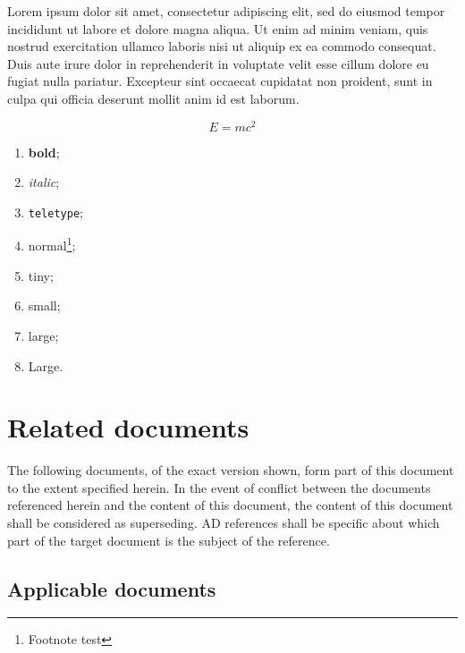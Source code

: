\documentclass[12pt,a4paper]{article}
\begin{document}
Lorem ipsum dolor sit amet, consectetur adipiscing elit, sed do eiusmod tempor incididunt ut labore et dolore magna aliqua. Ut enim ad minim veniam, quis nostrud exercitation ullamco laboris nisi ut aliquip ex ea commodo consequat. Duis aute irure dolor in reprehenderit in voluptate velit esse cillum dolore eu fugiat nulla pariatur. Excepteur sint occaecat cupidatat non proident, sunt in culpa qui officia deserunt mollit anim id est laborum.


\begin{equation}
  \label{eq:eq}
  E = mc^2
\end{equation}

\begin{enumerate}
\item {\bf bold};
\item {\it italic};
\item {\tt teletype};
\item normal\footnote{Footnote test};
\item {\tiny tiny};
\item {\small small};
\item {\large large};
\item {\Large Large}.
\end{enumerate}


\section{Related documents}

The following documents, of the exact version shown, form part of this document to the extent specified herein. In the event of conflict between the documents referenced herein and the content of this document, the content of this document shall be considered as superseding.  AD references shall be specific about which part of the target document is the subject of the reference.

\subsection{Applicable documents}
\begin{ADlist}
\end{ADlist}
\end{document}
